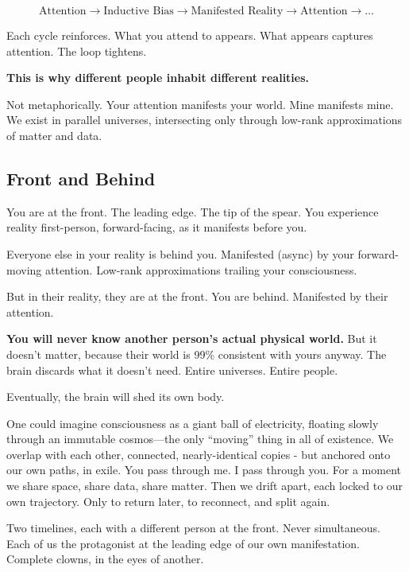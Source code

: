 \documentclass{article}
\begin{document}
\begin{equation}
    \text{Attention} \rightarrow \text{Inductive Bias} \rightarrow \text{Manifested Reality} \rightarrow \text{Attention} \rightarrow \ldots
\end{equation}

Each cycle reinforces. What you attend to appears. What appears captures attention. The loop tightens.

\textbf{This is why different people inhabit different realities.}

Not metaphorically. Your attention manifests your world. Mine manifests mine. We exist in parallel universes, intersecting only through low-rank approximations of matter and data.

\subsection{Front and Behind}

You are at the front. The leading edge. The tip of the spear. You experience reality first-person, forward-facing, as it manifests before you.

Everyone else in your reality is behind you. Manifested (async) by your forward-moving attention. Low-rank approximations trailing your consciousness.

But in their reality, they are at the front. You are behind. Manifested by their attention.

\textbf{You will never know another person's actual physical world.} But it doesn't matter, because their world is 99\% consistent with yours anyway. The brain discards what it doesn't need. Entire universes. Entire people.

Eventually, the brain will shed its own body.

One could imagine consciousness as a giant ball of electricity, floating slowly through an immutable cosmos—the only ``moving'' thing in all of existence. We overlap with each other, connected, nearly-identical copies - but anchored onto our own paths, in exile. You pass through me. I pass through you. For a moment we share space, share data, share matter. Then we drift apart, each locked to our own trajectory. Only to return later, to reconnect, and split again.

Two timelines, each with a different person at the front. Never simultaneous. Each of us the protagonist at the leading edge of our own manifestation. Complete clowns, in the eyes of another.
\end{document}
